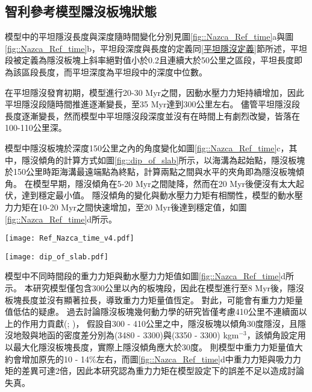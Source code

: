 \newpage
\subsection{智利參考模型隱沒板塊狀態}
模型中的平坦隱沒長度與深度隨時間變化分別見圖\ref{fig::Nazca_Ref_time}a與圖\ref{fig::Nazca_Ref_time}b，平坦段深度與長度的定義同\ref{平坦隱沒定義}節所述，平坦段被定義為隱沒板塊上斜率絕對值小於0.2且連續大於50公里之區段，平坦長度即為該區段長度，而平坦深度為平坦段中的深度中位數。

在平坦隱沒發育初期，模型進行20-30 Myr之間，因動水壓力力矩持續增加，因此平坦隱沒段隨時間推進逐漸變長，至35 Myr達到300公里左右。
儘管平坦隱沒段長度逐漸變長，然而模型中平坦隱沒段深度並沒有在時間上有劇烈改變，皆落在100-110公里深。

模型中隱沒板塊於深度150公里之內的角度變化如圖\ref{fig::Nazca_Ref_time}c，其中，隱沒傾角的計算方式如圖\ref{fig::dip_of_slab}所示，以海溝為起始點，隱沒板塊於150公里時距海溝最遠端點為終點，計算兩點之間與水平的夾角即為隱沒板塊傾角。
在模型早期，隱沒傾角在5-20 Myr之間陡降，然而在20 Myr後便沒有太大起伏，達到穩定最小值。
隱沒傾角的變化與動水壓力力矩有相關性，模型的動水壓力力矩在10-20 Myr之間快速增加，至20 Myr後達到穩定值，如圖\ref{fig::Nazca_Ref_time}d所示。

\begin{figure*}[ht!]
    \centering
    \texttt{[image: Ref\_Nazca\_time\_v4.pdf]}
    \caption[智利參考模型隱沒板塊狀態隨時間變化]{智利參考模型隱沒板塊狀態隨時間變化，灰色底標出平坦隱沒發育後時間段。(a)參考模型平坦長度隨時間變化。(b)參考模型平坦深度隨時間變化，灰虛線為\citealp{Manea2017}中提及之智利平坦隱沒平坦深度約落在100公里深。(c)參考模型隱沒板塊自海溝到深度150公里之傾角，傾角值有做1 Myr的移動平均。(d)參考模型中重力力矩與吸力力矩隨時間變化。其中粉紅色線為重力力矩，深藍色線為吸力力矩。兩者皆有做1 Myr的移動平均。}
    \label{fig::Nazca_Ref_time}
\end{figure*}

\begin{figure*}[h]
    \centering
    \texttt{[image: dip\_of\_slab.pdf]}
    \caption[本研究中隱沒傾角的計算方式]{本研究中隱沒傾角的計算方式。}
    \label{fig::dip_of_slab}
\end{figure*}

模型中不同時間段的重力力矩與動水壓力力矩值如圖\ref{fig::Nazca_Ref_time}d所示。
本研究模型僅包含300公里以內的板塊段，因此在模型進行至8 Myr後，隱沒板塊長度並沒有顯著拉長，導致重力力矩量值恆定。
對此，可能會有重力力矩量值低估的疑慮。
過去討論隱沒板塊幾何動力學的研究皆僅考慮410公里不連續面以上的作用力貢獻(\citealp{schellart2004quantifying}; \citealp{billen2008modeling})，
假設自300 - 410公里之中，隱沒板塊以傾角30度隱沒，且隱沒地殼與地函的密度差分別為(3480 - 3300)與(3350 - 3300) kgm$^{-3}$，該傾角設定用以最大化隱沒板塊長度，實際上隱沒傾角應大於30度。
則模型中重力力矩量值大約會增加原先的10 - 14$\%$左右，而圖\ref{fig::Nazca_Ref_time}d中重力力矩與吸力力矩的差異可達2倍，因此本研究認為重力力矩在模型設定下的誤差不足以造成討論失真。

